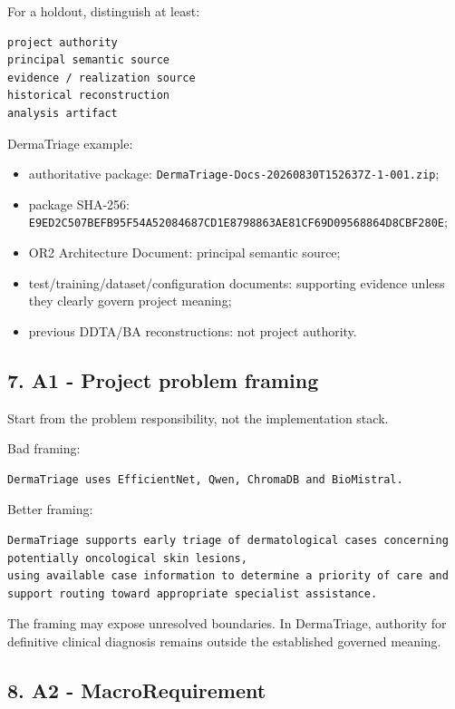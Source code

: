 \documentclass[11pt,a4paper]{article}
\providecommand{\tightlist}{\setlength{\itemsep}{0pt}\setlength{\parskip}{0pt}}
\begin{document}
For a holdout, distinguish at least:

\begin{verbatim}
project authority
principal semantic source
evidence / realization source
historical reconstruction
analysis artifact
\end{verbatim}

DermaTriage example:

\begin{itemize}
\tightlist
\item
  authoritative package:
  \texttt{DermaTriage-Docs-20260830T152637Z-1-001.zip};
\item
  package SHA-256:
  \texttt{E9ED2C507BEFB95F54A52084687CD1E8798863AE81CF69D09568864D8CBF280E};
\item
  OR2 Architecture Document: principal semantic source;
\item
  test/training/dataset/configuration documents: supporting evidence
  unless they clearly govern project meaning;
\item
  previous DDTA/BA reconstructions: not project authority.
\end{itemize}

\subsection{7. A1 - Project problem
framing}\label{7-a1---project-problem-framing}

Start from the problem responsibility, not the implementation stack.

Bad framing:

\begin{verbatim}
DermaTriage uses EfficientNet, Qwen, ChromaDB and BioMistral.
\end{verbatim}

Better framing:

\begin{verbatim}
DermaTriage supports early triage of dermatological cases concerning potentially oncological skin lesions,
using available case information to determine a priority of care and support routing toward appropriate specialist assistance.
\end{verbatim}

The framing may expose unresolved boundaries. In DermaTriage, authority
for definitive clinical diagnosis remains outside the established
governed meaning.

\subsection{8. A2 - MacroRequirement}\label{8-a2---macrorequirement}
\end{document}
